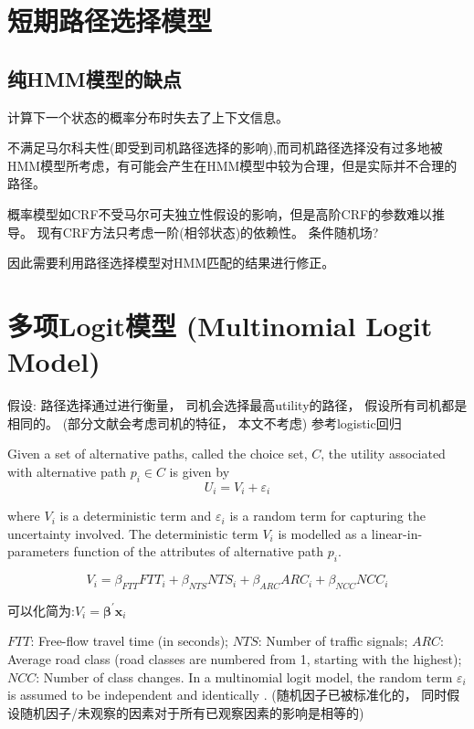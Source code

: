\section{短期路径选择模型}

\subsection{纯HMM模型的缺点}

\label{Problem:PureHMM1}

计算下一个状态的概率分布时失去了上下文信息。

不满足马尔科夫性(即受到司机路径选择的影响),而司机路径选择没有过多地被HMM模型所考虑，有可能会产生在HMM模型中较为合理，但是实际并不合理的路径。

概率模型如CRF不受马尔可夫独立性假设的影响，但是高阶CRF的参数难以推导。 现有CRF方法只考虑一阶(相邻状态)的依赖性。 条件随机场?

因此需要利用路径选择模型对HMM匹配的结果进行修正。

\section{多项Logit模型 (Multinomial Logit Model)}

假设: 路径选择通过进行衡量， 司机会选择最高utility的路径， 假设所有司机都是相同的。 (部分文献会考虑司机的特征， 本文不考虑) 参考logistic回归

Given a set of alternative paths, called the choice set, $ C $, the utility associated with alternative path $ p_{i} \in C $ is given by
\begin{equation}
U_{i}=V_{i}+\varepsilon_{i}
\end{equation}

where $ V_{i} $ is a deterministic term and $ \varepsilon_{i} $ is a random term for capturing the uncertainty involved. The deterministic term $ V_{i} $ is modelled as a linear-in-parameters function of the attributes of alternative path $ p_{i} $. 

\begin{equation} V_{i}=\beta_{F T T} F T T_{i}+\beta_{N T S} N T S_{i}+\beta_{A R C} A R C_{i}+\beta_{N C C} N C C_{i} \end{equation}

可以化简为:$ V_{i}=\boldsymbol{\beta}^{\prime} \boldsymbol{x}_{i} $

$FTT$: Free-flow travel time (in seconds); $N T S$: Number of traffic signals; $ARC$: Average road class (road classes are numbered from 1, starting with the highest); $NCC$: Number of class changes. In a multinomial logit model, the random term $ \varepsilon_{i} $ is assumed to be independent and identically . (随机因子已被标准化的， 同时假设随机因子/未观察的因素对于所有已观察因素的影响是相等的)

